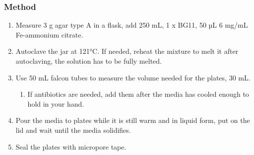 \subsubsection{Method}
\begin{enumerate}
    \item Measure 3 g agar type A in a flask, add 250 mL, 1 x BG11, 50 µL 6 mg/mL Fe-ammonium citrate. 
    \item Autoclave the jar at 121°C. If needed, reheat the mixture to melt it after autoclaving, the solution has to be fully melted.  
    \item Use 50 mL falcon tubes to measure the volume needed for the plates, 30 mL. 
    \begin{enumerate}
        \item If antibiotics are needed, add them after the media has cooled enough to hold in your hand.
    \end{enumerate}
\item Pour the media to plates while it is still warm and in liquid form, put on the lid and wait until the media solidifies. 
\item Seal the plates with micropore tape.
\end{enumerate}
